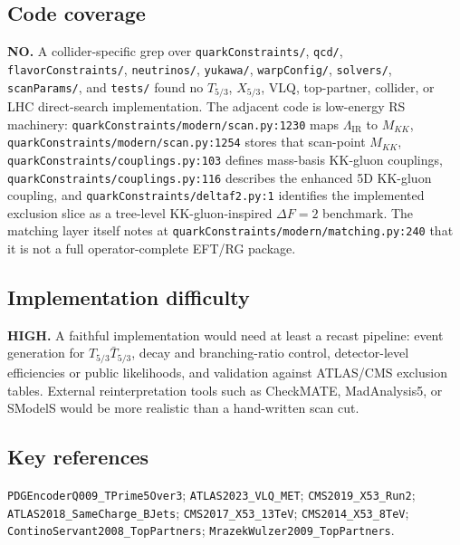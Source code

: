\subsection*{Code coverage}
\textbf{NO.}  A collider-specific grep over \texttt{quarkConstraints/},
\texttt{qcd/}, \texttt{flavorConstraints/}, \texttt{neutrinos/},
\texttt{yukawa/}, \texttt{warpConfig/}, \texttt{solvers/},
\texttt{scanParams/}, and \texttt{tests/} found no \(T_{5/3}\),
\(X_{5/3}\), VLQ, top-partner, collider, or LHC direct-search implementation.
The adjacent code is low-energy RS machinery: \texttt{quarkConstraints/modern/scan.py:1230}
maps \(\Lambda_{\mathrm{IR}}\) to \(M_{KK}\), \texttt{quarkConstraints/modern/scan.py:1254}
stores that scan-point \(M_{KK}\), \texttt{quarkConstraints/couplings.py:103}
defines mass-basis KK-gluon couplings, \texttt{quarkConstraints/couplings.py:116}
describes the enhanced 5D KK-gluon coupling, and
\texttt{quarkConstraints/deltaf2.py:1} identifies the implemented exclusion
slice as a tree-level KK-gluon-inspired \(\Delta F=2\) benchmark.  The
matching layer itself notes at \texttt{quarkConstraints/modern/matching.py:240}
that it is not a full operator-complete EFT/RG package.

\subsection*{Implementation difficulty}
\textbf{HIGH.}  A faithful implementation would need at least a recast pipeline:
event generation for \(T_{5/3}\bar T_{5/3}\), decay and branching-ratio
control, detector-level efficiencies or public likelihoods, and validation
against ATLAS/CMS exclusion tables.  External reinterpretation tools such as
CheckMATE, MadAnalysis5, or SModelS would be more realistic than a
hand-written scan cut.

\subsection*{Key references}
\texttt{PDGEncoderQ009\_TPrime5Over3};
\texttt{ATLAS2023\_VLQ\_MET};
\texttt{CMS2019\_X53\_Run2};
\texttt{ATLAS2018\_SameCharge\_BJets};
\texttt{CMS2017\_X53\_13TeV};
\texttt{CMS2014\_X53\_8TeV};
\texttt{ContinoServant2008\_TopPartners};
\texttt{MrazekWulzer2009\_TopPartners}.
